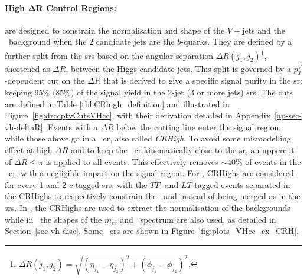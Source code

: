 \paragraph{High $\boldsymbol{\Delta R}$ Control Regions:} are designed to constrain the normalisation and shape of the $V+$jets and the \ttb\ background when the 2 candidate jets are the $b$-quarks. They are defined by a further split from the \glspl{sr} based on the angular separation $\Delta R(j_1, j_2)$\footnote{$\Delta R(j_1, j_2) = \sqrt{(\eta_{j_1} - \eta_{j_2})^2 + (\phi_{j_1} - \phi_{j_2})^2 }$.}, shortened as $\Delta R$, between the Higgs-candidate jets. This split is governed by a $p_T^V$-dependent cut on the $\Delta R$ that is derived to give a specific signal purity in the \gls{sr}: keeping 95\% (85\%) of the signal yield in the 2-jet (3 or more jets) \glspl{sr}. The cuts are defined in Table \ref{tbl:CRhigh_definition} and illustrated in Figure~\ref{fig:drccptvCutsVHcc}, with their derivation detailed in Appendix~\ref{ap-sec-vh-deltaR}. Events with a $\Delta R$ below the cutting line enter the signal region, while those above go in a \highdr\ \gls{cr}, also called \textit{CRHigh}. To avoid some mismodelling effect at high $\Delta R$ and to keep the \highdr\ \gls{cr} kinematically close to the \gls{sr}, an uppercut of $\Delta R \leq \pi$ is applied to all events. This effectively removes $\sim 40$\% of events in the \highdr\ \gls{cr}, with a negligible impact on the signal region. For \vhc, CRHighs are considered for every 1 and 2 $c$-tagged \glspl{sr}, with the $TT$- and $LT$-tagged events separated in the CRHighs to respectively constrain the \vhf\ and \vmf instead of being merged as in the \glspl{sr}. In \vhb, the CRHighs are used to extract the normalisation of the backgrounds while in \vhc\ the shapes of the $m_{c\bar{c}}$ and \ptv\ spectrum are also used, as detailed in Section~\ref{sec-vh-disc}. Some \highdr\ \glspl{cr} are shown in Figure~\ref{fig:plots_VHcc_ex_CRH}.


